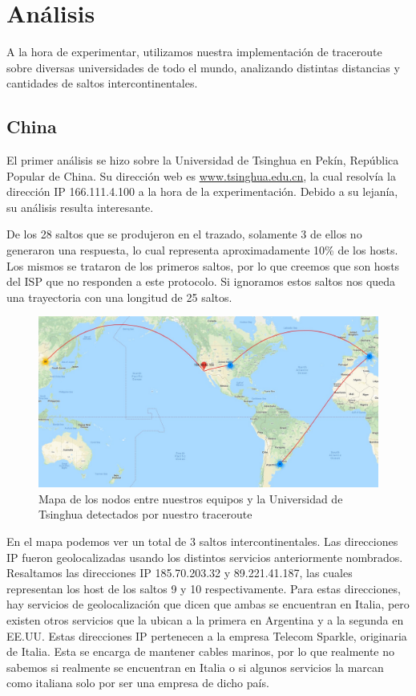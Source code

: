 \section{Análisis}

A la hora de experimentar, utilizamos nuestra implementación de traceroute sobre diversas universidades de todo el mundo, analizando distintas distancias y cantidades de saltos intercontinentales.

\subsection{China}

El primer análisis se hizo sobre la Universidad de Tsinghua en Pekín, República Popular de China. Su dirección web es \url{www.tsinghua.edu.cn}, la cual resolvía la dirección IP 166.111.4.100 a la hora de la experimentación. Debido a su lejanía, su análisis resulta interesante.

De los 28 saltos que se produjeron en el trazado, solamente 3 de ellos no generaron una respuesta, lo cual representa aproximadamente 10\% de los hosts. Los mismos se trataron de los primeros saltos, por lo que creemos que son hosts del ISP que no responden a este protocolo. Si ignoramos estos saltos nos queda una trayectoria con una longitud de 25 saltos.

\begin{figure}[H]
	\centering
	\includegraphics[width=.7\linewidth]{china_mapa.jpg}
	\captionsetup{justification=centering}
	\caption{Mapa de los nodos entre nuestros equipos y la Universidad de Tsinghua detectados por nuestro traceroute}
\end{figure}

En el mapa podemos ver un total de 3 saltos intercontinentales. Las direcciones IP fueron geolocalizadas usando los distintos servicios anteriormente nombrados. Resaltamos las direcciones IP 185.70.203.32 y 89.221.41.187, las cuales representan los host de los saltos 9 y 10 respectivamente. Para estas direcciones, hay servicios de geolocalización que dicen que ambas se encuentran en Italia, pero existen otros servicios que la ubican a la primera en Argentina y a la segunda en EE.UU. Estas direcciones IP pertenecen a la empresa Telecom Sparkle, originaria de Italia. Esta se encarga de mantener cables marinos, por lo que realmente no sabemos si realmente se encuentran en Italia o si algunos servicios la marcan como italiana solo por ser una empresa de dicho país.

